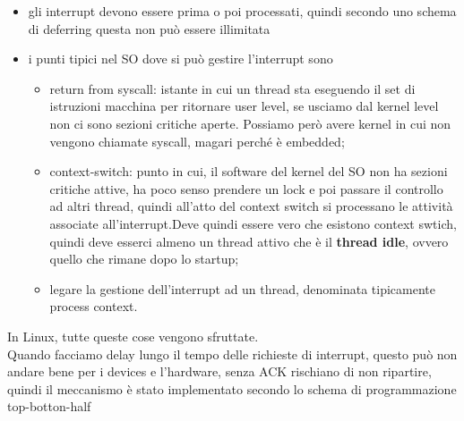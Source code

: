 \documentclass[12pt, oneside]{extbook}
\begin{document}
\begin{itemize}
\item gli interrupt devono essere prima o poi processati, quindi secondo uno schema di deferring questa non può essere illimitata
\item i punti tipici nel SO dove si può gestire l'interrupt sono
\begin{itemize}
\item return from syscall: istante in cui un thread sta eseguendo il set di istruzioni macchina per ritornare user level, se usciamo dal kernel level non ci sono sezioni critiche aperte. Possiamo però avere kernel in cui non vengono chiamate syscall, magari perché è embedded;
\item context-switch: punto in cui, il software del kernel del SO non ha sezioni critiche attive, ha poco senso prendere un lock e poi passare il controllo ad altri thread, quindi all'atto del context switch si processano le attività associate all'interrupt.Deve quindi essere vero che esistono context swtich, quindi deve esserci almeno un thread attivo che è il \textbf{thread idle}, ovvero quello che rimane dopo lo startup;
\item legare la gestione dell'interrupt ad un thread, denominata tipicamente process context.
\end{itemize}
\end{itemize}
In Linux, tutte queste cose vengono sfruttate.\\Quando facciamo delay lungo il tempo delle richieste di interrupt, questo può non andare bene per i devices e l'hardware, senza ACK rischiano di non ripartire, quindi il meccanismo è stato implementato secondo lo schema di programmazione top-botton-half
\end{document}

